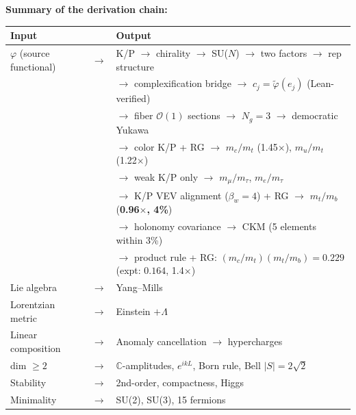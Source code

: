 \documentclass[12pt,a4paper]{article}
\begin{document}
\noindent\textbf{Summary of the derivation chain:}
\begin{center}
\begin{tabular}{lcl}
\toprule
Input & & Output \\
\midrule
$\varphi$ (source functional) & $\to$ & K/P $\to$ chirality $\to$ SU($N$) $\to$ two factors $\to$ rep structure \\
& & $\to$ complexification bridge $\to$ $c_j = \tilde\varphi(e_j)$ (Lean-verified) \\
& & $\to$ fiber $\mathcal{O}(1)$ sections $\to$ $N_g = 3$ $\to$ democratic Yukawa \\
& & $\to$ color K/P + RG $\to$ $m_c/m_t$ (1.45$\times$), $m_u/m_t$ (1.22$\times$) \\
& & $\to$ weak K/P only $\to$ $m_\mu/m_\tau$, $m_e/m_\tau$ \\
& & $\to$ K/P VEV alignment ($\beta_w{=}4$) + RG $\to$ $m_t/m_b$ (\textbf{0.96$\times$, 4\%}) \\
& & $\to$ holonomy covariance $\to$ CKM (5 elements within 3\%) \\
& & $\to$ product rule + RG: $(m_c/m_t)(m_t/m_b) = 0.229$ (expt: $0.164$, 1.4$\times$) \\
Lie algebra & $\to$ & Yang--Mills \\
Lorentzian metric & $\to$ & Einstein $+ \Lambda$ \\
Linear composition & $\to$ & Anomaly cancellation $\to$ hypercharges \\
dim $\geq 2$ & $\to$ & $\mathbb{C}$-amplitudes, $e^{ikL}$, Born rule, Bell $|S| = 2\sqrt{2}$ \\
Stability & $\to$ & 2nd-order, compactness, Higgs \\
Minimality & $\to$ & SU(2), SU(3), 15 fermions \\
\bottomrule
\end{tabular}
\end{center}
\end{document}

